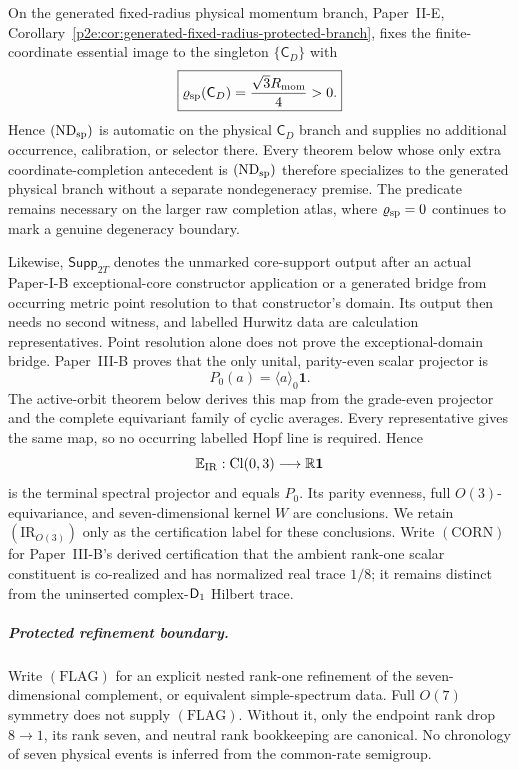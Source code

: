 \documentclass[12pt,a4paper]{article}
\begin{document}
\begin{corollary}
\label{p3c:cor:v261-physical-ndsp-discharge}
On the generated fixed-radius physical momentum branch, Paper~II-E,
Corollary~\ref{p2e:cor:generated-fixed-radius-protected-branch}, fixes the
finite-coordinate essential image to the singleton \(\{\mathsf C_D\}\) with
\[
 \boxed{\varrho_{\rm sp}(\mathsf C_D)=\frac{\sqrt3R_{\mathrm{mom}}}{4}>0.}
\]
Hence \((\mathrm{ND}_{\rm sp})\) is automatic on the physical \(\mathsf C_D\)
branch and supplies no additional occurrence, calibration, or selector there.
Every theorem below whose only extra coordinate-completion antecedent is
\((\mathrm{ND}_{\rm sp})\) therefore specializes to the generated physical
branch without a separate nondegeneracy premise.  The predicate remains
necessary on the larger raw completion atlas, where \(\varrho_{\rm sp}=0\)
continues to mark a genuine degeneracy boundary.
\end{corollary}
  Likewise,
\(\mathsf{Supp}_{2T}\) denotes the unmarked core-support output
after an actual Paper-I-B exceptional-core constructor application or a
generated bridge from occurring metric point resolution to that constructor's
domain.  Its output then needs no second witness, and labelled Hurwitz data are
calculation representatives.  Point resolution alone does not prove the
exceptional-domain bridge.  Paper~III-B proves that the only unital,
parity-even scalar projector is
\[
        P_0(a)=\langle a\rangle_0\mathbf1.
\]
The active-orbit theorem below derives this map from the grade-even projector
and the complete equivariant family of cyclic averages.  Every representative
gives the same map, so no occurring labelled Hopf line is required.  Hence
\[
        \mathbb E_{\rm IR}:\operatorname{Cl}(0,3)\longrightarrow\mathbb R\mathbf1
\]
is the terminal spectral projector and equals \(P_0\).  Its parity evenness,
full \(O(3)\)-equivariance, and seven-dimensional kernel \(W\) are
conclusions.  We retain \((\mathrm{IR}_{O(3)})\) only as the certification
label for these conclusions.  Write \((\mathrm{CORN})\) for Paper~III-B's
derived certification that the ambient rank-one scalar constituent is
co-realized and has normalized real trace \(1/8\); it remains distinct from
the uninserted complex-\(\mathsf{D}_1\) Hilbert trace.

\subparagraph{Protected refinement boundary.}
Write \((\mathrm{FLAG})\) for an explicit nested rank-one refinement of the
seven-dimensional complement, or equivalent simple-spectrum data.  Full
\(O(7)\) symmetry does not supply \((\mathrm{FLAG})\).  Without it, only the
endpoint rank drop \(8\to1\), its rank seven, and neutral rank bookkeeping are
canonical.  No chronology of seven physical events is inferred from the
common-rate semigroup.
\end{document}
